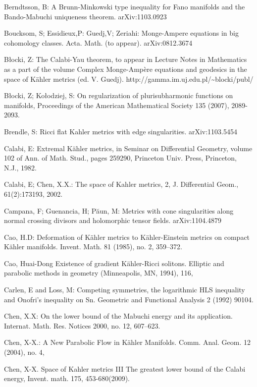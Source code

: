 \documentclass[11pt,oneside,english]{amsart}
\numberwithin{equation}{section}
\numberwithin{figure}{section}
\theoremstyle{plain}
\theoremstyle{plain}
\theoremstyle{plain}
\theoremstyle{plain}
\theoremstyle{remark}
\theoremstyle{definition}
\begin{document}
\begin{thebibliography}{10}
Berndtsson, B: A Brunn-Minkowski type inequality for
Fano manifolds and the Bando-Mabuchi uniqueness theorem. arXiv:1103.0923

Boucksom, S; Essidieux,P: Guedj,V; Zeriahi: Monge-Ampere
equations in big cohomology classes. Acta. Math. (to appear). arXiv:0812.3674

B\l{}ocki, Z: The Calabi-Yau theorem, to appear in Lecture
Notes in Mathematics as a part of the volume Complex Monge-Ampère
equations and geodesics in the space of Kähler metrics (ed. V. Guedj).
http://gamma.im.uj.edu.pl/\textasciitilde{}blocki/publ/

B\l{}ocki, Z; Ko\l{}odziej, S: On regularization of
plurisubharmonic functions on manifolds, Proceedings of the American
Mathematical Society 135 (2007), 2089-2093.

Brendle, S: Ricci flat Kahler metrics with edge singularities.
arXiv:1103.5454

Calabi, E: Extremal Kähler metrics, in Seminar on Differential
Geometry, volume 102 of Ann. of Math. Stud., pages 259\textendash{}290,
Princeton Univ. Press, Princeton, N.J., 1982.

Calabi, E; Chen, X.X.: The space of K\textasciidieresis{}ahler
metrics, 2, J. Differential Geom., 61(2):173\textendash{}193, 2002.

Campana, F; Guenancia, H; P\u{a}un, M: Metrics with
cone singularities along normal crossing divisors and holomorphic
tensor fields. arXiv:1104.4879

Cao, H.D: Deformation of Kähler metrics to Kähler-Einstein
metrics on compact Kähler manifolds. Invent. Math. 81 (1985), no.
2, 359--372.

Cao, Huai-Dong Existence of gradient Kähler-Ricci solitons.
Elliptic and parabolic methods in geometry (Minneapolis, MN, 1994),
1\textendash{}16,

Carlen, E and Loss, M: Competing symmetries, the logarithmic
HLS inequality and Onofri's inequality on Sn. Geometric and Functional
Analysis 2 (1992) 90\textendash{}104.

Chen, X.X: On the lower bound of the Mabuchi energy
and its application. Internat. Math. Res. Notices 2000, no. 12, 607--623.

Chen, X-X.: A New Parabolic Flow in Kähler Manifolds.
Comm. Anal. Geom. 12 (2004), no. 4,

Chen, X-X. Space of K\textasciidieresis{}ahler metrics
III\textendash{} The greatest lower bound of the Calabi energy, Invent.
math. 175, 453-680(2009).


\end{thebibliography}
\end{document}
